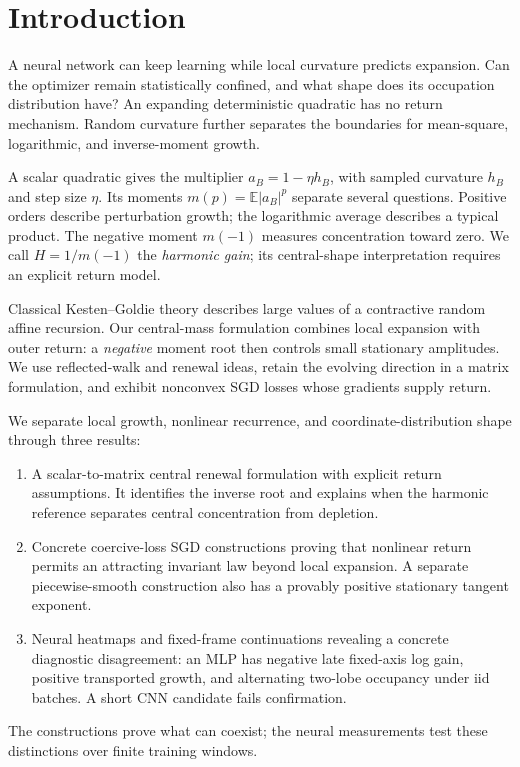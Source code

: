 \section{Introduction}
A neural network can keep learning while local curvature predicts expansion. Can the optimizer remain statistically confined, and what shape does its occupation distribution have? An expanding deterministic quadratic has no return mechanism. Random curvature further separates the boundaries for mean-square, logarithmic, and inverse-moment growth.

A scalar quadratic gives the multiplier $a_B=1-\eta h_B$, with sampled curvature $h_B$ and step size $\eta$. Its moments $m(p)=\mathbb E|a_B|^p$ separate several questions. Positive orders describe perturbation growth; the logarithmic average describes a typical product. The negative moment $m(-1)$ measures concentration toward zero. We call $H=1/m(-1)$ the \emph{harmonic gain}; its central-shape interpretation requires an explicit return model.

Classical Kesten--Goldie theory describes large values of a contractive random affine recursion. Our central-mass formulation combines local expansion with outer return: a \emph{negative} moment root then controls small stationary amplitudes. We use reflected-walk and renewal ideas, retain the evolving direction in a matrix formulation, and exhibit nonconvex SGD losses whose gradients supply return.

We separate local growth, nonlinear recurrence, and coordinate-distribution shape through three results:
\begin{enumerate}
\item A scalar-to-matrix central renewal formulation with explicit return assumptions. It identifies the inverse root and explains when the harmonic reference separates central concentration from depletion.
\item Concrete coercive-loss SGD constructions proving that nonlinear return permits an attracting invariant law beyond local expansion. A separate piecewise-smooth construction also has a provably positive stationary tangent exponent.
\item Neural heatmaps and fixed-frame continuations revealing a concrete diagnostic disagreement: an MLP has negative late fixed-axis log gain, positive transported growth, and alternating two-lobe occupancy under iid batches. A short CNN candidate fails confirmation.
\end{enumerate}
The constructions prove what can coexist; the neural measurements test these distinctions over finite training windows.


